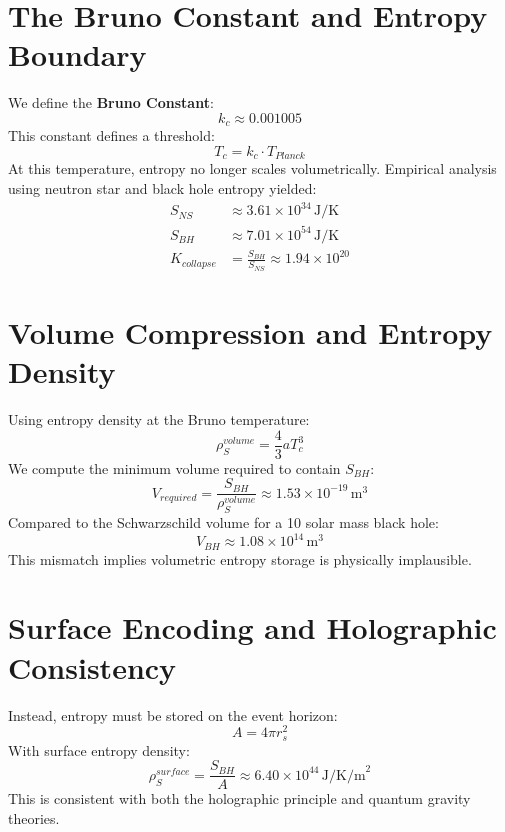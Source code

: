 \documentclass[12pt]{article}
\begin{document}
\section{The Bruno Constant and Entropy Boundary}
We define the \textbf{Bruno Constant}:
\begin{equation}
\boxed{k_c \approx 0.001005}
\end{equation}
This constant defines a threshold:
\begin{equation}
T_c = k_c \cdot T_{Planck}
\end{equation}
At this temperature, entropy no longer scales volumetrically. Empirical analysis using neutron star and black hole entropy yielded:
\begin{align}
S_{NS} &\approx 3.61 \times 10^{34} \, \text{J/K} \\
S_{BH} &\approx 7.01 \times 10^{54} \, \text{J/K} \\
K_{collapse} &= \frac{S_{BH}}{S_{NS}} \approx 1.94 \times 10^{20}
\end{align}

\section{Volume Compression and Entropy Density}
Using entropy density at the Bruno temperature:
\begin{equation}
\rho_S^{volume} = \frac{4}{3} a T_c^3
\end{equation}
We compute the minimum volume required to contain $S_{BH}$:
\begin{equation}
V_{required} = \frac{S_{BH}}{\rho_S^{volume}} \approx 1.53 \times 10^{-19} \, \text{m}^3
\end{equation}
Compared to the Schwarzschild volume for a 10 solar mass black hole:
\begin{equation}
V_{BH} \approx 1.08 \times 10^{14} \, \text{m}^3
\end{equation}
This mismatch implies volumetric entropy storage is physically implausible.

\section{Surface Encoding and Holographic Consistency}
Instead, entropy must be stored on the event horizon:
\begin{equation}
A = 4\pi r_s^2
\end{equation}
With surface entropy density:
\begin{equation}
\rho_S^{surface} = \frac{S_{BH}}{A} \approx 6.40 \times 10^{44} \, \text{J/K/m}^2
\end{equation}
This is consistent with both the holographic principle and quantum gravity theories.
\end{document}
